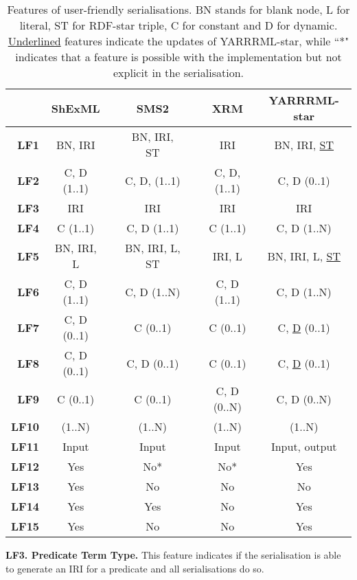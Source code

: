 \begin{table}[t!]
\caption{Features of user-friendly serialisations. BN stands for blank node, L for literal, ST for RDF-star triple, C for constant and D for dynamic. \underline{Underlined} features indicate the updates of YARRRML-star, while
``*" indicates that a feature is possible with the implementation but not explicit in the serialisation.}
\label{tab:chp5_lang-comparison}
\centering
\begin{tabular}{r|cccccc}
 & \textbf{ShExML} & & \textbf{SMS2} & & \textbf{XRM} & \textbf{YARRRML-star} \\ \midrule
\textbf{LF1}& BN, IRI & & BN, IRI, ST & & IRI& BN, IRI, \underline{ST}\\ \midrule
\textbf{LF2}& C, D (1..1) & & C, D, (1..1) & & C, D, (1..1) & C, D (0..1)\\ \midrule
\textbf{LF3}& IRI & & IRI & & IRI & IRI\\ \midrule
\textbf{LF4}& C (1..1) & & C, D (1..1) & & C (1..1) & C, D (1..N)\\ \midrule
\textbf{LF5} & BN, IRI, L & & BN, IRI, L, ST & & IRI, L & BN, IRI, L, \underline{ST} \\ \midrule
\textbf{LF6} & C, D (1..1) & & C, D (1..N) & & C, D (1..1) & C, D (1..N)\\ \midrule
\textbf{LF7} & C, D (0..1) & & C (0..1) & & C (0..1) & C, \underline{D} (0..1)\\ \midrule
\textbf{LF8}& C, D (0..1) & & C, D (0..1) & & C (0..1) & C, \underline{D} (0..1)\\ \midrule
\textbf{LF9}& C (0..1) & & C (0..1) & & C, D (0..N) & C, D (0..N)\\ \midrule
\textbf{LF10} & (1..N) & & (1..N) & & (1..N) & (1..N)\\ \midrule
\textbf{LF11} & Input & & Input & & Input & Input, output\\ \midrule
\textbf{LF12} & Yes & & No* & & No* & Yes\\ \midrule
\textbf{LF13}& Yes & & No & & No & No \\ \midrule
\textbf{LF14} & Yes & & Yes & & No & Yes\\ \midrule
\textbf{LF15}& Yes & & No & & No & Yes\\ \midrule
\end{tabular}
\end{table}


\textbf{LF3. Predicate Term Type.} 
This feature indicates if the serialisation is able to generate an IRI for a predicate and all serialisations do so.

